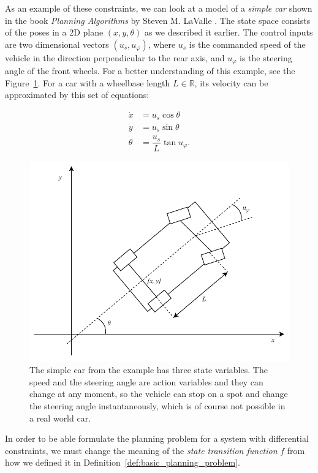 As an example of these constraints, we can look at a model of a \textit{simple car} shown in the book \textit{Planning Algorithms} by Steven M. LaValle \cite[Section~13.1.2.1]{lavalle_2006}. The state space consists of the poses in a 2D plane $(x, y, \theta)$ as we described it earlier. The control inputs are two dimensional vectors $\left(u_s, u_\varphi\right)$, where $u_s$ is the commanded speed of the vehicle in the direction perpendicular to the rear axis, and $u_\varphi$ is the steering angle of the front wheels. For a better understanding of this example, see the Figure~\ref{fig:simple_car}. For a car with a wheelbase length $L\in\mathbb{R}$, its velocity can be approximated by this set of equations:

\begin{equation}
\begin{aligned}
\dot{x}&=u_s \cos \theta \\
\dot{y}&=u_s \sin \theta \\
\dot{\theta}&=\dfrac{u_s}{L} \tan u_\varphi.
\end{aligned}
\end{equation}

\begin{figure}
	\centering
	\label{fig:simple_car}
	\includegraphics[width=12cm]{../img/simple_car.pdf}
	\caption{The simple car from the example has three state variables. The speed and the steering angle are action variables and they can change at any moment, so the vehicle can stop on a spot and change the steering angle instantaneously, which is of course not possible in a real world car.}
\end{figure}

In order to be able formulate the planning problem for a system with differential constraints, we must change the meaning of the \textit{state transition function} $f$ from how we defined it in Definition~\ref{def:basic_planning_problem}.

